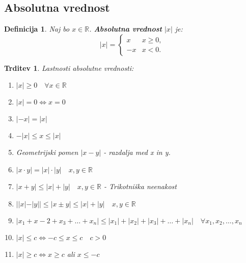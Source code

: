 \documentclass[11pt]{article}
\newtheorem{Trditev}[Izrek]{{\sc Trditev}}
\newtheorem{Definicija}[Izrek]{{\sc Definicija}}
\begin{document}
\subsection{Absolutna vrednost}
\begin{Definicija}
	Naj bo $x\in \mathbb{R}$. \textbf{Absolutna vrednost} $|x|$ je:
	\begin{displaymath}
	|x| = \left\{ \begin{array}{cc}
	 x & \textrm{$x\ge 0$},\\
	-x & \textrm{$x <0$}.
	\end{array} \right.
	\end{displaymath}
\end{Definicija}
\begin{Trditev}
	Lastnosti absolutne vrednosti:
	\begin{enumerate}
		\item
		$|x| \ge 0 \quad \forall x\in\mathbb{R}$
		\item
		$|x| = 0 \iff x = 0$
		\item
		$|-x| = |x|$
		\item
		$ -|x| \le x\le |x|$
		\item
		Geometrijski pomen $|x-y|$ - razdalja med x in y.
		\item
		$|x\cdot y| = |x| \cdot |y| \quad x,y\in \mathbb{R}$
		\item
		$|x+y| \le |x| +|y| \quad x,y\in \mathbb{R}$ - Trikotniška neenakost
		\item
		$||x| -|y|| \le |x\pm y| \le |x| + |y| \quad x,y\in \mathbb{R}$
		\item
		$|x_1 + x-2 +x_3 + \dots + x_n| \le |x_1| +|x_2| +|x_3| + \dots + |x_n| \quad \forall x_1,x_2,\dots, x_n$
		\item
		$|x| \le c \iff -c \le x \le c \quad c>0$
		\item
		$|x| \ge c \iff x \ge c$ ali $x \le -c$
	\end{enumerate}
\end{Trditev}
\end{document}
